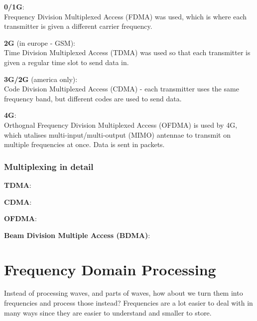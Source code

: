 
\begin{description}
  \item \textbf{0/1G}:\\
    Frequency Division Multiplexed Access (FDMA) was used, which is where
    each transmitter is given a different carrier frequency.
  \item \textbf{2G} (in europe - GSM):\\
    Time Division Multiplexed Access (TDMA) was used so that each transmitter
    is given a regular time slot to send data in.
  \item \textbf{3G/2G} (america only):\\
    Code Division Multiplexed Access (CDMA) - each transmitter uses the same
    frequency band, but different codes are used to send data.
  \item \textbf{4G}:\\
    Orthognal Frequency Division Multiplexed Access (OFDMA) is used by 4G, which
    utalises multi-input/multi-output (MIMO) antennae to transmit on multiple 
    frequencies at once. Data is sent in packets.
\end{description}

\subsubsection{Multiplexing in detail}

\begin{description}
  \item \textbf{TDMA}:\\
  \item \textbf{CDMA}:\\
  \item \textbf{OFDMA}:\\
  \item \textbf{Beam Division Multiple Access (BDMA)}:\\
  
\end{description}

\section{Frequency Domain Processing}

Instead of processing waves, and parts of waves, how about we turn them into
frequencies and process those instead? Frequencies are a lot easier to deal with
in many ways since they are easier to understand and smaller to store.

